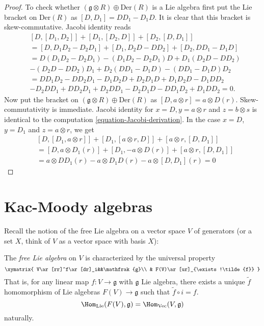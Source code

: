\begin{proof}
\medskip\noindent
To check whether $(\mathfrak{g}\otimes R)\oplus\text{Der}(R)$ is a Lie algebra 
first put the Lie bracket on $\text{Der}(R)$ as
$[D,D_1]=DD_1-D_1D$. It is clear that this bracket is skew-commutative. 
Jacobi identity reads
\begin{align*}
&[D,[D_1,D_2]]+[D_1,[D_2,D]]+[D_2,[D,D_1]]\\
&=[D,D_1D_2-D_2D_1]+[D_1,D_2D-DD_2]+[D_2,DD_1-D_1D]\\
&=D(D_1D_2-D_2D_1)-(D_1D_2-D_2D_1)D+D_1(D_2D-DD_2)\\
&-(D_2D-DD_2)D_1+D_2(DD_1-D_1D)-(DD_1-D_1D)D_2\\
&=DD_1D_2-DD_2D_1-D_1D_2D+D_2D_1D+D_1D_2D-D_1DD_2\\
&-D_2DD_1+DD_2D_1+D_2DD_1-D_2D_1D-DD_1D_2+D_1DD_2=0.
\end{align*}
Now put the bracket on $(\mathfrak{g} \otimes  R)\oplus\text{Der}(R)$ as
$[D,a \otimes  r]=a \otimes D(r)$. Skew-commutativity is immediate. 
Jacobi identity for $x=D,y=a\otimes r$ and $z=b\otimes s$ is identical to the
computation \ref{equation-Jacobi-derivation}. In the case
$x=D$, $y=D_1$ and $z=a\otimes r$, we get
\begin{align*}
&[D,[D_1,a\otimes r]]+[D_1,[a\otimes r,D]]+[a\otimes r,[D,D_1]]\\
&=[D,a\otimes D_1(r)]+[D_1,-a\otimes D(r)]+[a\otimes r,[D,D_1]]\\
&=a\otimes DD_1(r)-a\otimes D_1D(r)-a\otimes [D,D_1](r)=0
\end{align*}
\end{proof}

\section{Kac-Moody algebras}
\label{section-Kac-Moody-algebras}

Recall the notion of the free Lie algebra on a 
vector space $V$ of generators 
(or a set $X$, think of $V$ as a vector space with basis $X$):

\begin{definition}
\label{definition-free-Lie-algebra}
The {\it free Lie algebra} on $V$ is characterized by the universal property
$$
\xymatrix{
V\ar[rr]^f\ar[dr]_i&&\mathfrak{g}\\
& F(V)\ar[ur]_{\exists !\tilde{f}}
}
$$
That is, for any linear map $f:V \to \mathfrak{g}$ with $\mathfrak{g}$ Lie
algebra, there exists a unique $\tilde{f}$ homomorphism of Lie algebras 
$F(V)\to \mathfrak{g}$ such that $\tilde{f} \circ i=f$.
$$
\Hom_{\text{Lie}}(F(V),\mathfrak{g})=\Hom_{\text{Vec}}(V,\mathfrak{g})
$$
naturally.
\end{definition}

